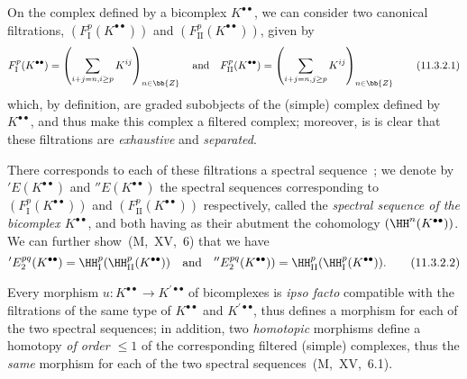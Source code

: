 \begin{env}[11.3.2]
\label{0.11.3.2}
On the complex defined by a bicomplex $K^{\bullet\bullet}$, we can consider two canonical filtrations, $(F_\mathrm{I}^p(K^{\bullet\bullet}))$ and $(F_\mathrm{II}^p(K^{\bullet\bullet}))$, given by
\[
\label{0.11.3.2.1}
  F_\mathrm{I}^p(K^{\bullet\bullet})
  = \left(\sum_{i+j=n,i\geq p}K^{ij}\right)_{n\in\bb{Z}}
  \quad\text{and}\quad
  F_\mathrm{II}^p(K^{\bullet\bullet})
  = \left(\sum_{i+j=n,j\geq p}K^{ij}\right)_{n\in\bb{Z}}
  \tag{11.3.2.1}
\]
which, by definition, are graded subobjects of the (simple) complex defined by $K^{\bullet\bullet}$, and thus make this complex a filtered complex;
moreover, is is clear that these filtrations are \emph{exhaustive} and \emph{separated}.

There corresponds to each of these filtrations a spectral sequence~;
we denote by $'E(K^{\bullet\bullet})$ and $''E(K^{\bullet\bullet})$ the spectral sequences corresponding to $(F_\mathrm{I}^p(K^{\bullet\bullet}))$ and $(F_\mathrm{II}^p(K^{\bullet\bullet}))$ respectively, called the \emph{spectral sequence of the bicomplex $K^{\bullet\bullet}$}, and both having as their abutment the cohomology $(\HH^n(K^{\bullet\bullet}))$.
We can further show~(M,~XV,~6) that we have
\[
\label{0.11.3.2.2}
  'E_2^{pq}(K^{\bullet\bullet})
  = \HH_\mathrm{I}^p(\HH_\mathrm{II}^p(K^{\bullet\bullet}))
  \quad\text{and}\quad
  ''E_2^{pq}(K^{\bullet\bullet}))
  = \HH_\mathrm{II}^p(\HH_\mathrm{I}^p(K^{\bullet\bullet})).
  \tag{11.3.2.2}
\]

Every morphism $u:K^{\bullet\bullet}\to K^{\prime\bullet\bullet}$ of bicomplexes is \emph{ipso facto} compatible with the filtrations of the same type of $K^{\bullet\bullet}$ and $K^{\prime\bullet\bullet}$, thus defines a morphism for each of the two spectral sequences;
in addition, two \emph{homotopic} morphisms define a homotopy \emph{of order $\leq 1$} of the corresponding filtered (simple) complexes, thus the \emph{same} morphism for each of the two spectral sequences~(M,~XV,~6.1).
\end{env}

